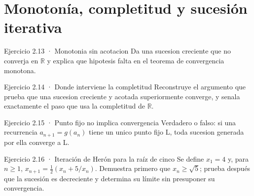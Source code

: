 \documentclass[10pt,a4paper,oneside,openany]{book}
\begin{document}
\section{Monotonía, completitud y sucesión iterativa}
\begin{PSevenExerciseFixed}{Ejercicio 2.13 · Monotonia sin acotacion}
Da una sucesion creciente que no converja en \(\mathbb{R}\) y explica que hipotesis falta en el teorema de convergencia monotona.
\end{PSevenExerciseFixed}
\begin{PSevenExerciseFixed}{Ejercicio 2.14 · Donde interviene la completitud}
Reconstruye el argumento que prueba que una sucesion creciente y acotada superiormente converge, y senala exactamente el paso que usa la completitud de \(\mathbb{R}\).
\end{PSevenExerciseFixed}
\begin{PSevenExerciseFixed}{Ejercicio 2.15 · Punto fijo no implica convergencia}
Verdadero o falso: si una recurrencia \(a_{n+1}=g(a_n)\) tiene un unico punto fijo L, toda sucesion generada por ella converge a L.
\end{PSevenExerciseFixed}
\begin{PSevenExerciseFixed}{Ejercicio 2.16 · Iteración de Herón para la raíz de cinco}
Se define \(x_1=4\) y, para \(n\ge1\), \(x_{n+1}=\tfrac12(x_n+5/x_n)\). Demuestra primero que \(x_n\ge\sqrt5\); prueba después que la sucesión es decreciente y determina su límite sin presuponer su convergencia.
\end{PSevenExerciseFixed}
\end{document}
